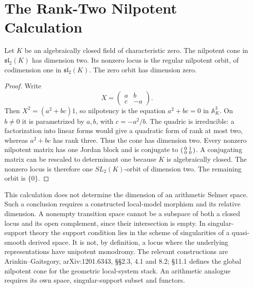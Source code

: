 \section{The Rank-Two Nilpotent Calculation}
\label{v4-arith:w6-g:agdet-transition}

\begin{proposition}
\label{v4-arith:w6-g:prop:codim-2}
Let $K$ be an algebraically closed field of characteristic zero.
The nilpotent cone in $\mathfrak{sl}_2(K)$ has dimension two.
Its nonzero locus is the regular nilpotent orbit, of codimension
one in $\mathfrak{sl}_2(K)$. The zero orbit has dimension zero.
\end{proposition}

\begin{proof}
Write
\[
 X=\begin{pmatrix}a&b\\c&-a\end{pmatrix}.
\]
Then $X^2=(a^2+bc)1$, so nilpotency is the equation
$a^2+bc=0$ in $\mathbb A_K^3$.
On $b\ne0$ it is parametrized by $a,b$, with $c=-a^2/b$.
The quadric is irreducible: a factorization into linear forms would
give a quadratic form of rank at most two, whereas $a^2+bc$ has
rank three. Thus the cone has dimension two.
Every nonzero nilpotent matrix has one Jordan block and is
conjugate to $\begin{psmallmatrix}0&1\\0&0\end{psmallmatrix}$.
A conjugating matrix can be rescaled to determinant one because
$K$ is algebraically closed. The nonzero locus is therefore one
$SL_2(K)$-orbit of dimension two. The remaining orbit is $\{0\}$.
\end{proof}

\begin{remark}
\label{v4-arith:w6-g:rem:codim-2-role}
This calculation does not determine the dimension of an arithmetic
Selmer space. Such a conclusion requires a constructed local-model
morphism and its relative dimension. A nonempty transition space
cannot be a subspace of both a closed locus and its open complement,
since their intersection is empty.
In singular-support theory the support condition lies in the scheme
of singularities of a quasi-smooth derived space. It is not, by
definition, a locus where the underlying representations have
unipotent monodromy. The relevant constructions are
Arinkin--Gaitsgory, arXiv:1201.6343, \S\S2.3, 4.1 and 8.2;
\S11.1 defines the global nilpotent cone for the geometric
local-system stack. An arithmetic analogue requires its own
space, singular-support subset and functors.
\end{remark}

